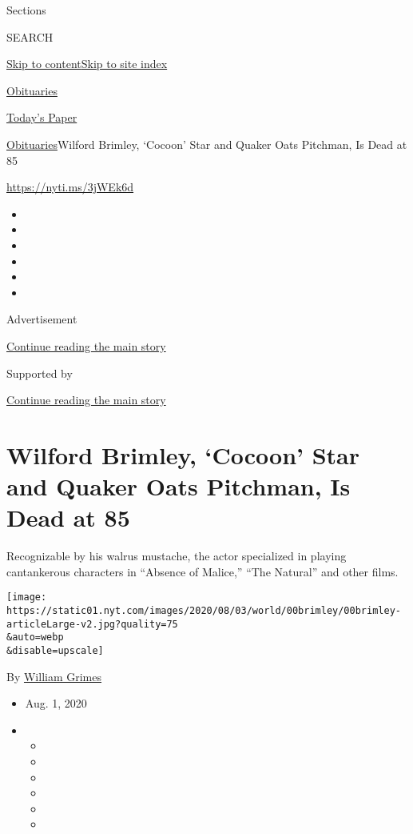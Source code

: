 Sections

SEARCH

\protect\hyperlink{site-content}{Skip to
content}\protect\hyperlink{site-index}{Skip to site index}

\href{https://www.nytimes.com/section/obituaries}{Obituaries}

\href{https://myaccount.nytimes.com/auth/login?response_type=cookie\&client_id=vi}{}

\href{https://www.nytimes.com/section/todayspaper}{Today's Paper}

\href{/section/obituaries}{Obituaries}\textbar{}Wilford Brimley,
`Cocoon' Star and Quaker Oats Pitchman, Is Dead at 85

\url{https://nyti.ms/3jWEk6d}

\begin{itemize}
\item
\item
\item
\item
\item
\item
\end{itemize}

Advertisement

\protect\hyperlink{after-top}{Continue reading the main story}

Supported by

\protect\hyperlink{after-sponsor}{Continue reading the main story}

\hypertarget{wilford-brimley-cocoon-star-and-quaker-oats-pitchman-is-dead-at-85}{%
\section{Wilford Brimley, `Cocoon' Star and Quaker Oats Pitchman, Is
Dead at
85}\label{wilford-brimley-cocoon-star-and-quaker-oats-pitchman-is-dead-at-85}}

Recognizable by his walrus mustache, the actor specialized in playing
cantankerous characters in ``Absence of Malice,'' ``The Natural'' and
other films.

\texttt{[image: https://static01.nyt.com/images/2020/08/03/world/00brimley/00brimley-articleLarge-v2.jpg?quality=75\\\&auto=webp\\\&disable=upscale]}

By \href{https://www.nytimes.com/by/william-grimes}{William Grimes}

\begin{itemize}
\item
  Aug. 1, 2020
\item
  \begin{itemize}
  \item
  \item
  \item
  \item
  \item
  \item
  \end{itemize}
\end{itemize}

